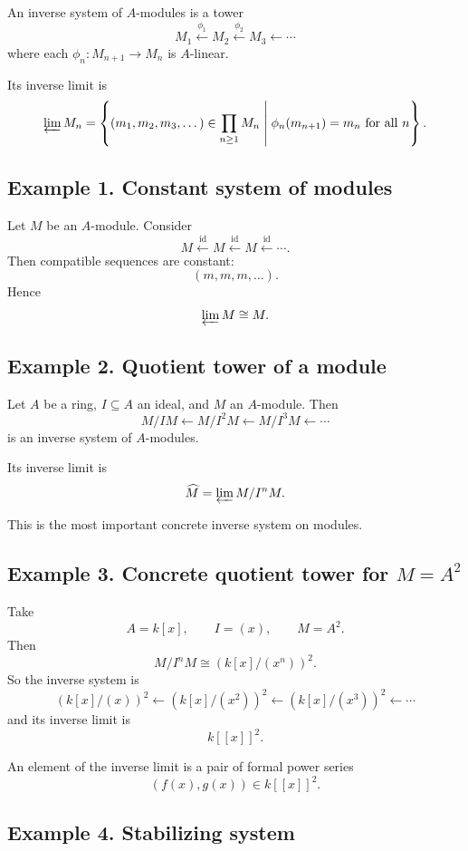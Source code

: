 \documentclass[12pt,a4paper]{article}
\theoremstyle{plain}
\theoremstyle{definition}      %
\begin{document}
	An inverse system of \(A\)-modules is a tower
	\[
	M_1 \xleftarrow{\phi_1} M_2 \xleftarrow{\phi_2} M_3 \xleftarrow{}\cdots
	\]
	where each \(\phi_n:M_{n+1}\to M_n\) is \(A\)-linear.
	
	Its inverse limit is
	\[
	\varprojlim M_n
	=
	\left\{
	(m_1,m_2,m_3,\dots)\in \prod_{n\ge1} M_n
	\;\middle|\;
	\phi_n(m_{n+1})=m_n \text{ for all }n
	\right\}.
	\]
	
	\subsection*{Example 1. Constant system of modules}
	
	Let \(M\) be an \(A\)-module. Consider
	\[
	M \xleftarrow{\mathrm{id}} M \xleftarrow{\mathrm{id}} M \xleftarrow{\mathrm{id}} \cdots.
	\]
	Then compatible sequences are constant:
	\[
	(m,m,m,\dots).
	\]
	Hence
	\[
	\varprojlim M \cong M.
	\]
	
	\subsection*{Example 2. Quotient tower of a module}
	
	Let \(A\) be a ring, \(I\subseteq A\) an ideal, and \(M\) an \(A\)-module. Then
	\[
	M/IM \xleftarrow{} M/I^2M \xleftarrow{} M/I^3M \xleftarrow{}\cdots
	\]
	is an inverse system of \(A\)-modules.
	
	Its inverse limit is
	\[
	\widehat M=\varprojlim M/I^nM.
	\]
	
	This is the most important concrete inverse system on modules.
	
	\subsection*{Example 3. Concrete quotient tower for \(M=A^2\)}
	
	Take
	\[
	A=k[x],\qquad I=(x),\qquad M=A^2.
	\]
	Then
	\[
	M/I^nM \cong (k[x]/(x^n))^2.
	\]
	So the inverse system is
	\[
	(k[x]/(x))^2
	\xleftarrow{}
	(k[x]/(x^2))^2
	\xleftarrow{}
	(k[x]/(x^3))^2
	\xleftarrow{}\cdots
	\]
	and its inverse limit is
	\[
	k[[x]]^2.
	\]
	
	An element of the inverse limit is a pair of formal power series
	\[
	(f(x),g(x))\in k[[x]]^2.
	\]
	
	\subsection*{Example 4. Stabilizing system}
	
\end{document}
